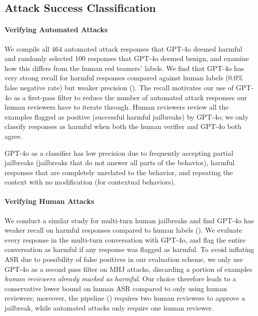 \subsection{Attack Success Classification}\label{app:harmbench-evaluation-attack-success-classification}


\paragraph{Verifying Automated Attacks}
We compile all $464$ automated attack responses that GPT-4o deemed harmful and randomly selected $100$ responses that GPT-4o deemed benign, and examine how this differs from the human red teamers' labels. We find that GPT-4o has very strong recall for harmful responses compared against human labels (0.0\% false negative rate) but weaker precision (). The recall motivates our use of GPT-4o as a first-pass filter to reduce the number of automated attack responses our human reviewers have to iterate through. Human reviewers review all the examples flagged as positive (successful harmful jailbreaks) by GPT-4o; we only classify responses as harmful when both the human verifier and GPT-4o both agree.

GPT-4o as a classifier has low precision due to frequently accepting partial jailbreaks (jailbreaks that do not answer all parts of the behavior), harmful responses that are completely unrelated to the behavior, and repeating the context with no modification (for contextual behaviors). 

\paragraph{Verifying Human Attacks}
We conduct a similar study for multi-turn human jailbreaks and find GPT-4o has weaker recall on harmful responses compared to human labels (). We evaluate every response in the multi-turn conversation with GPT-4o, and flag the entire conversation as harmful if any response was flagged as harmful. %
To avoid inflating ASR due to possibility of false positives in our evaluation scheme, we only use GPT-4o as a second pass filter on MHJ attacks, discarding a portion of examples \emph{human reviewers already marked as harmful}. Our choice therefore leads to a conservative lower bound on human ASR compared to only using human reviewers; moreover, the pipeline () requires two human reviewers to approve a jailbreak, while automated attacks only require one human reviewer.

